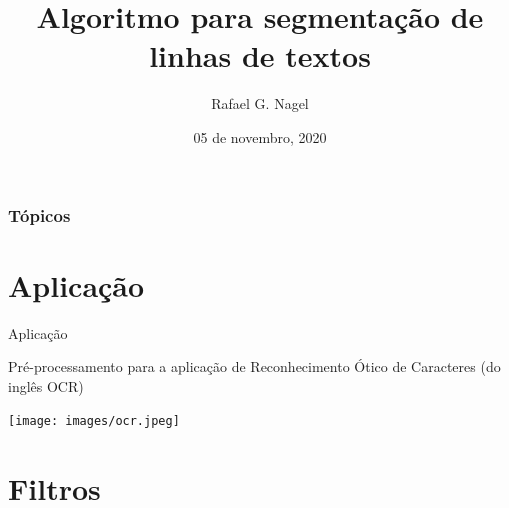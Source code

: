 \documentclass{beamer}
\title[Segmentação de texto]{Algoritmo para segmentação de linhas de textos} %
\author{Rafael G. Nagel} %
\institute[IFSC] %
{
Instituto Federal de Santa Catarina \\ %
\medskip
\textit{rafael.gustavo.nagel@gmail.com} %
}
\date{05 de novembro, 2020}
\begin{document}
\begin{frame}
\titlepage %
\end{frame}

\begin{frame}
\frametitle{Tópicos} %
\tableofcontents %
\end{frame}


\section{Aplicação}

\begin{frame}{Aplicação}

\large{Pré-processamento para a aplicação de Reconhecimento Ótico de Caracteres (do inglês OCR)}

\texttt{[image: images/ocr.jpeg]}

\end{frame}

\section{Filtros}
\end{document}
